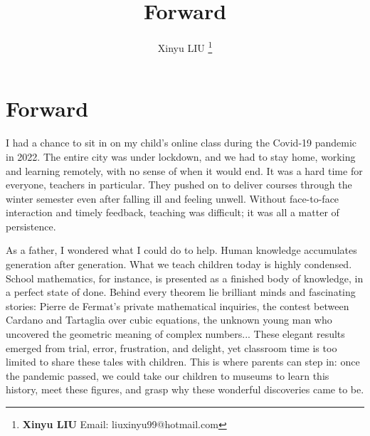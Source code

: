 \documentclass[b5paper]{article}
\begin{document}
\title{Forward}

\author{Xinyu LIU
\thanks{{\bfseries Xinyu LIU} \newline
  Email: liuxinyu99@hotmail.com \newline}
  }

\maketitle
\fi


\ifx\wholebook\relax
\chapter*{Forward}
\fi

I had a chance to sit in on my child's online class during the Covid-19 pandemic in 2022. The entire city was under lockdown, and we had to stay home, working and learning remotely, with no sense of when it would end. It was a hard time for everyone, teachers in particular. They pushed on to deliver courses through the winter semester even after falling ill and feeling unwell. Without face-to-face interaction and timely feedback, teaching was difficult; it was all a matter of persistence.

As a father, I wondered what I could do to help. Human knowledge accumulates generation after generation. What we teach children today is highly condensed. School mathematics, for instance, is presented as a finished body of knowledge, in a perfect state of done. Behind every theorem lie brilliant minds and fascinating stories: Pierre de Fermat's private mathematical inquiries, the contest between Cardano and Tartaglia over cubic equations, the unknown young man who uncovered the geometric meaning of complex numbers... These elegant results emerged from trial, error, frustration, and delight, yet classroom time is too limited to share these tales with children. This is where parents can step in: once the pandemic passed, we could take our children to museums to learn this history, meet these figures, and grasp why these wonderful discoveries came to be.
\end{document}
